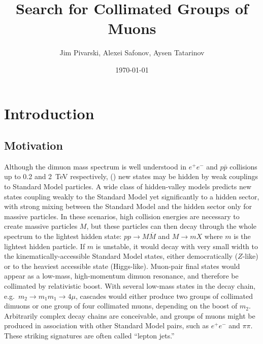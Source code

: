 \documentclass[12pt]{cms-tdr}
\title{Search for Collimated Groups of Muons}
\author{Jim Pivarski, Alexei Safonov, Aysen Tatarinov}
\date{\today}
\begin{document}
\maketitle

\section{Introduction}

\subsection{Motivation}


Although the dimuon mass spectrum is well understood in $e^+e^-$ and
$p\bar{p}$ collisions up to 0.2 and 2~TeV respectively, () new states may be hidden by weak couplings to
Standard Model particles.  A wide class of hidden-valley models
predicts new states coupling weakly to the Standard Model yet
significantly to a hidden sector, with strong mixing between the
Standard Model and the hidden sector only for massive particles.  In
these scenarios, high collision energies are necessary to create
massive particles $M$, but these particles can then decay through the
whole spectrum to the lightest hidden state: $pp \to M\overline{M}$
and $M \to m X$ where $m$ is the lightest hidden particle.  If $m$ is
unstable, it would decay with very small width to the
kinematically-accessible Standard Model states, either democratically
($Z$-like) or to the heaviest accessible state (Higgs-like).
Muon-pair final states would appear as a low-mass, high-momentum
dimuon resonance, and therefore be collimated by relativistic boost.
With several low-mass states in the decay chain, e.g.\ $m_2 \to m_1
m_1 \to 4\mu$, cascades would either produce two groups of collimated
dimuons or one group of four collimated muons, depending on the boost
of $m_2$.  Arbitrarily complex decay chains are conceivable, and
groups of muons might be produced in association with other Standard
Model pairs, such as $e^+e^-$ and $\pi\pi$.  These striking signatures
are often called ``lepton jets.''
\end{document}
